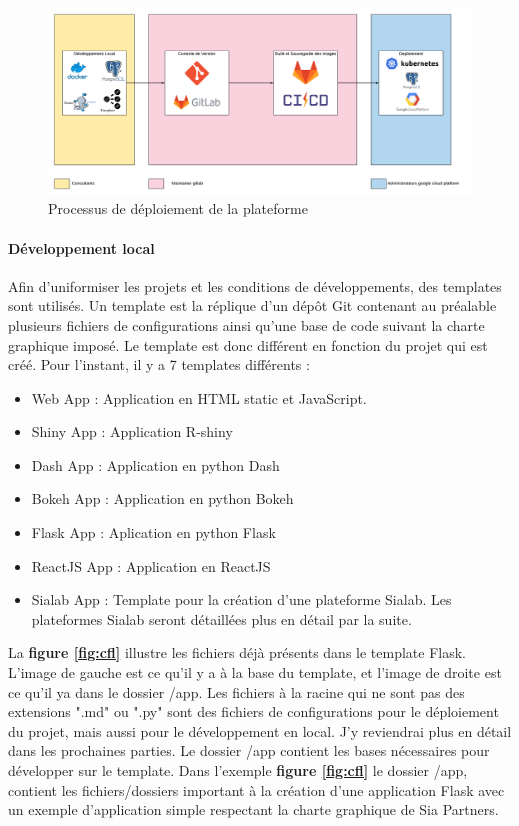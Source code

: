 \documentclass{article} %
\begin{document}
\begin{figure}[!h]
 \centering
 \includegraphics[keepaspectratio = true,scale=0.4]{structure.png}
 \caption{Processus de déploiement de la plateforme}
 \label{fig:struct}
\end{figure}

\paragraph{Développement local\\}
Afin d'uniformiser les projets et les conditions de développements, des templates sont utilisés. Un template est la réplique d'un dépôt Git contenant au préalable plusieurs fichiers de configurations ainsi qu'une base de code suivant la charte graphique imposé. Le template est donc différent en fonction du projet qui est créé. Pour l'instant, il y a 7 templates différents :
\begin{itemize}
 \item Web App : Application en HTML static et JavaScript.
 \item Shiny App : Application R-shiny
 \item Dash App : Application en python Dash
 \item Bokeh App : Application en python Bokeh
 \item Flask App : Aplication en python Flask
 \item ReactJS App : Application en ReactJS
 \item Sialab App : Template pour la création d'une plateforme Sialab. Les plateformes Sialab seront détaillées plus en détail par la suite.
\end{itemize}

La \textbf{figure \ref{fig:cfl}} illustre les fichiers déjà présents dans le template Flask.  L'image de gauche est ce qu'il y a à la base du template, et l'image de droite est ce qu'il ya dans le dossier /app. Les fichiers à la racine qui ne sont pas des extensions ".md" ou ".py" sont des fichiers de configurations pour le déploiement du projet, mais aussi pour le développement en local. J'y reviendrai plus en détail dans les prochaines parties. Le dossier /app contient les bases nécessaires pour développer sur le template. Dans l'exemple \textbf{figure \ref{fig:cfl}} le dossier /app, contient les fichiers/dossiers important à la création d'une application Flask avec un exemple d'application simple respectant la charte graphique de Sia Partners.
\end{document}
